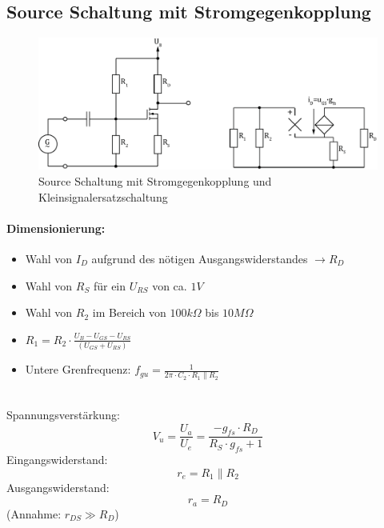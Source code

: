 



\subsection{Source Schaltung mit Stromgegenkopplung}
\begin{figure}[h!]
	\centering
	\includegraphics[width = \linewidth]{fet_source_i.pdf}
	\caption{Source Schaltung mit Stromgegenkopplung und Kleinsignalersatzschaltung}
	\label{fet:sourceschaltung_i}
\end{figure}
\noindent
\paragraph{Dimensionierung:}
\begin{itemize}
	\item Wahl von $I_D$ aufgrund des nötigen Ausgangswiderstandes $\rightarrow R_D$
	\item Wahl von $R_S$ für ein $U_{RS}$ von ca. $1V$
	\item Wahl von $R_2$ im Bereich von $100k\Omega$ bis $10M\Omega$
	\item $R_1 = R_2 \cdot \frac{U_B - U_{GS} - U_{RS}}{(U_{GS}+U_{RS})}$
	\item Untere Grenfrequenz: $f_{gu} = \frac{1}{2\pi \cdot C_2 \cdot R_1 \parallel R_2}$
\end{itemize}
\noindent\\
Spannungsverstärkung:
\[
	V_u = \frac{U_a}{U_e} = \frac{-g_{fs} \cdot R_D}{R_S \cdot g_{fs} + 1}
\]
Eingangswiderstand:
\[
	r_e = R_1 \parallel R_2
\]
Ausgangswiderstand:
\[
	r_a = R_D
\]
(Annahme: $r_{DS} \gg R_D$)